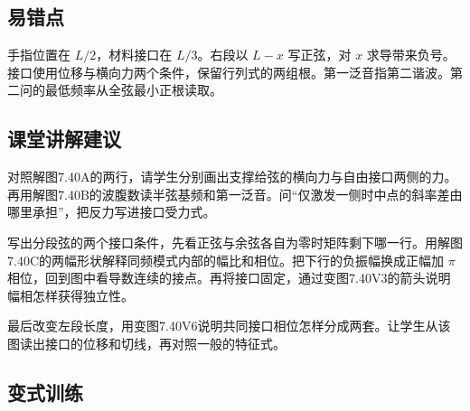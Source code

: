 \documentclass[UTF8,fontset=fandol,a4paper,11pt]{ctexart}
\begin{document}


\subsection*{易错点}

手指位置在 $L/2$，材料接口在 $L/3$。右段以 $L-x$ 写正弦，对 $x$ 求导带来负号。接口使用位移与横向力两个条件，保留行列式的两组根。第一泛音指第二谐波。第二问的最低频率从全弦最小正根读取。




\subsection*{课堂讲解建议}

对照解图7.40A的两行，请学生分别画出支撑给弦的横向力与自由接口两侧的力。再用解图7.40B的波腹数读半弦基频和第一泛音。问“仅激发一侧时中点的斜率差由哪里承担”，把反力写进接口受力式。

写出分段弦的两个接口条件，先看正弦与余弦各自为零时矩阵剩下哪一行。用解图7.40C的两幅形状解释同频模式内部的幅比和相位。把下行的负振幅换成正幅加 $\pi$ 相位，回到图中看导数连续的接点。再将接口固定，通过变图7.40V3的箭头说明幅相怎样获得独立性。

最后改变左段长度，用变图7.40V6说明共同接口相位怎样分成两套。让学生从该图读出接口的位移和切线，再对照一般的特征式。




\subsection*{变式训练}
\end{document}
